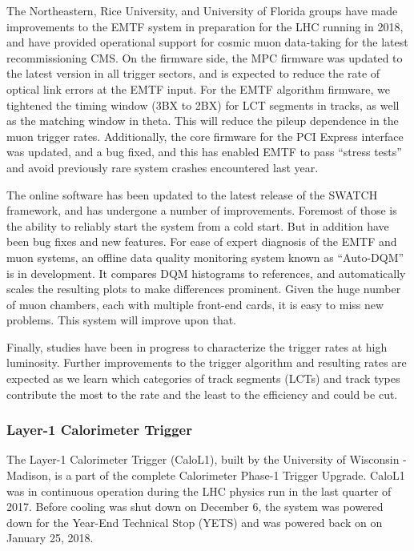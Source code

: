 \documentclass[12pt]{article}
\begin{document}
The Northeastern, Rice University, and University of Florida groups
have made improvements to the EMTF system in preparation for the LHC
running in 2018, and have provided operational support for cosmic muon
data-taking for the latest recommissioning CMS. On the firmware side,
the MPC firmware was updated to the latest version in all trigger sectors,
and is expected to reduce the rate of optical link errors at the EMTF
input. For the EMTF algorithm firmware, we tightened the timing window
(3BX to 2BX) for LCT segments in tracks, as well as the matching
window in theta. This will reduce the pileup dependence in the muon
trigger rates. Additionally, the core firmware for the PCI Express
interface was updated, and a bug fixed, and this has enabled EMTF to pass
``stress tests'' and avoid previously rare system crashes encountered
last year.

The online software has been updated to the latest release of the
SWATCH framework, and has undergone a number of improvements. Foremost
of those is the ability to reliably start the system from a cold
start. But in addition have been bug fixes and new features. 
For ease of expert diagnosis of the EMTF and muon systems, an offline
data quality monitoring system known as ``Auto-DQM'' is in
development. It compares DQM histograms to references,
and automatically scales the resulting plots to make differences
prominent. Given the huge number of muon chambers, each with multiple
front-end cards, it is easy to miss new problems. This system will
improve upon that.

Finally, studies have been in progress to characterize the trigger
rates at high luminosity. Further improvements to the trigger
algorithm and resulting rates are expected as we learn which
categories of track segments (LCTs) and track types contribute the
most to the rate and the least to the efficiency and could be cut.

\subsubsection{Layer-1 Calorimeter Trigger}

The Layer-1 Calorimeter Trigger (CaloL1), built by the University of Wisconsin - Madison, is a part of the complete Calorimeter Phase-1 Trigger Upgrade. CaloL1 was in continuous operation during the LHC physics run in the last quarter of 2017.  Before cooling was shut down on December 6, the system was powered down for the Year-End Technical Stop (YETS) and was powered back on on January 25, 2018.
\end{document}
